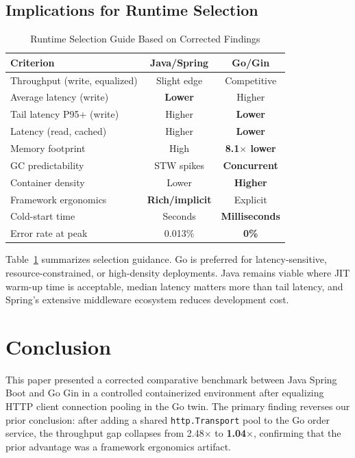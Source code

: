 \documentclass[conference]{IEEEtran}
\begin{document}
\subsection{Implications for Runtime Selection}

\begin{table}[htbp]
\caption{Runtime Selection Guide Based on Corrected Findings}
\begin{center}
\begin{tabular}{|l|c|c|}
\hline
\textbf{Criterion} & \textbf{Java/Spring} & \textbf{Go/Gin} \\
\hline
Throughput (write, equalized) & Slight edge & Competitive \\
Average latency (write) & \textbf{Lower} & Higher \\
Tail latency P95+ (write) & Higher & \textbf{Lower} \\
Latency (read, cached) & Higher & \textbf{Lower} \\
Memory footprint & High & \textbf{8.1$\times$ lower} \\
GC predictability & STW spikes & \textbf{Concurrent} \\
Container density & Lower & \textbf{Higher} \\
Framework ergonomics & \textbf{Rich/implicit} & Explicit \\
Cold-start time & Seconds & \textbf{Milliseconds} \\
Error rate at peak & 0.013\% & \textbf{0\%} \\
\hline
\end{tabular}
\label{tab:selection}
\end{center}
\end{table}

Table~\ref{tab:selection} summarizes selection guidance. Go is preferred for latency-sensitive, resource-constrained, or high-density deployments. Java remains viable where JIT warm-up time is acceptable, median latency matters more than tail latency, and Spring's extensive middleware ecosystem reduces development cost.

\section{Conclusion}

This paper presented a corrected comparative benchmark between Java Spring Boot and Go Gin in a controlled containerized environment after equalizing HTTP client connection pooling in the Go twin. The primary finding reverses our prior conclusion: after adding a shared \texttt{http.Transport} pool to the Go order service, the throughput gap collapses from 2.48$\times$ to \textbf{1.04$\times$}, confirming that the prior advantage was a framework ergonomics artifact.
\end{document}
